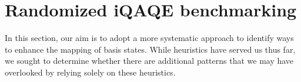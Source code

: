 




\section{Randomized iQAQE benchmarking}
\label{section:Randomized_iQAQE_benchmarking}

In this section, our aim is to adopt a more systematic approach to identify ways to enhance the mapping of basis states. While heuristics have served us thus far, we sought to determine whether there are additional patterns that we may have overlooked by relying solely on these heuristics.


